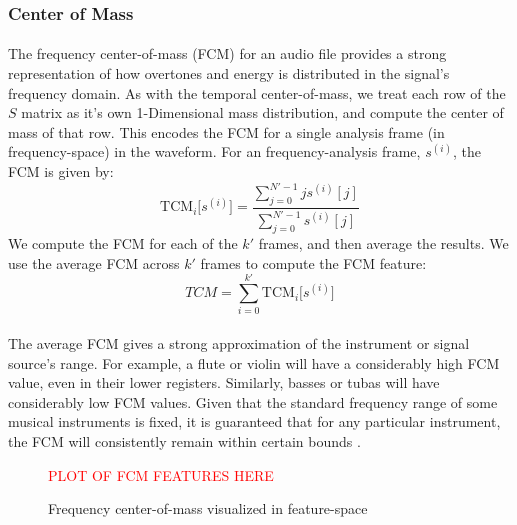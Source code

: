 \documentclass[12pt,letterpaper]{article}
\begin{document}
\subsubsection{Center of Mass}

\paragraph*{}The frequency center-of-mass (FCM) for an audio file provides a strong representation of how overtones and energy is distributed in the signal's frequency domain. As with the temporal center-of-mass, we treat each row of the $S$ matrix as it's own 1-Dimensional mass distribution, and compute the center of mass of that row. This encodes the FCM for a single analysis frame (in frequency-space) in the waveform. For an frequency-analysis frame, $s^{(i)}$, the FCM is given by:
\begin{equation}
\label{eqn-FeatureFCM}
\text{TCM}_{i}\big[ s^{(i)} \big] = \frac{\sum_{j=0}^{N'-1}j s^{(i)}[j]}{\sum_{j=0}^{N'-1}s^{(i)}[j]}
\end{equation}
We compute the FCM for each of the $k'$ frames, and then average the results. We use the average FCM across $k'$ frames to compute the FCM feature:
\begin{equation}
TCM = \sum_{i=0}^{k'} \text{TCM}_{i}\big[ s^{(i)} \big]
\end{equation}

\paragraph*{}The average FCM gives a strong approximation of the instrument or signal source's range. For example, a flute or violin will have a considerably high FCM value, even in their lower registers. Similarly, basses or tubas will have considerably low FCM values. Given that the standard frequency range of some musical instruments is fixed, it is guaranteed that for any particular instrument, the FCM will consistently remain within certain bounds \cite{Olson,White}.

\begin{figure}[H]
\label{fig-FeatureFCM}
\begin{center}
\textcolor{red}{PLOT OF FCM FEATURES HERE}
\end{center}
\caption{Frequency center-of-mass visualized in feature-space}
\end{figure}

\end{document}

